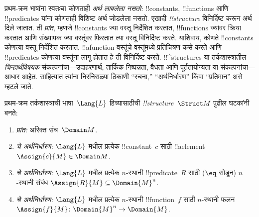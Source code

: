 \documentclass[../../../include/open-logic-section]{subfiles}
\begin{document}


\begin{explain}
प्रथम-क्रम भाषांना स्वतःचा कोणताही \emph{अर्थ लावलेला नसतो:}
!!{constant}s, !!{function}s आणि !!{predicate}s यांना कोणताही विशिष्ट
अर्थ जोडलेला नसतो. एखादी  \emph{!!{structure}}
विनिर्दिष्ट करून अर्थ दिले जातात. ती \emph{प्रांत}, म्हणजे
!!{constant}s ज्या वस्तू निर्देशित करतात, !!{function}s ज्यांवर क्रिया
करतात आणि संख्यापक ज्या वस्तूंवर फिरतात त्या वस्तू विनिर्दिष्ट करते.
याशिवाय, कोणते !!{constant}s कोणत्या वस्तू निर्देशित करतात,
!!a{function} वस्तूंचे वस्तूंमध्ये प्रतिचित्रण कसे करते आणि !!{predicate}s
कोणत्या वस्तूंना लागू होतात हे ती विनिर्दिष्ट करते. !!^{structure}s या
तर्कशास्त्रातील \emph{चिन्हार्थविषयक} संकल्पनांचा---उदाहरणार्थ, तार्किक
निष्पन्नता, वैधता आणि पूर्ततायोग्यता या संकल्पनांचा---आधार आहेत. साहित्यात त्यांना
निरनिराळ्या ठिकाणी ``रचना,'' ``अर्थनिर्धारण'' किंवा ``प्रतिमान'' असे
म्हटले जाते.
\end{explain}

\begin{defn}[!!^{structure}s]
प्रथम-क्रम तर्कशास्त्राची भाषा~$\Lang{L}$ हिच्यासाठीची
 \emph{!!{structure}}~$\Struct M$ पुढील घटकांनी बनते:
\begin{enumerate}
\item \emph{प्रांत:} अरिक्त संच~$\Domain M$.
\item \emph{चे अर्थनिर्धारण:} $\Lang{L}$ मधील प्रत्येक
  !!{constant}~$c$ साठी !!a{element}~$\Assign{c}{M} \in \Domain M$.
\item \emph{चे अर्थनिर्धारण:} $\Lang{L}$ मधील प्रत्येक
  $n$-स्थानी !!{predicate}~$R$ साठी ($\eq$ सोडून) $n$-स्थानी संबंध
  $\Assign{R}{M} \subseteq \Domain{M}^n$.
\item \emph{चे अर्थनिर्धारण:} $\Lang{L}$ मधील प्रत्येक
  $n$-स्थानी !!{function}~$f$ साठी $n$-स्थानी फलन
  $\Assign{f}{M} \colon \Domain{M}^n \to \Domain{M}$.
\end{enumerate}
\end{defn}
\end{document}
